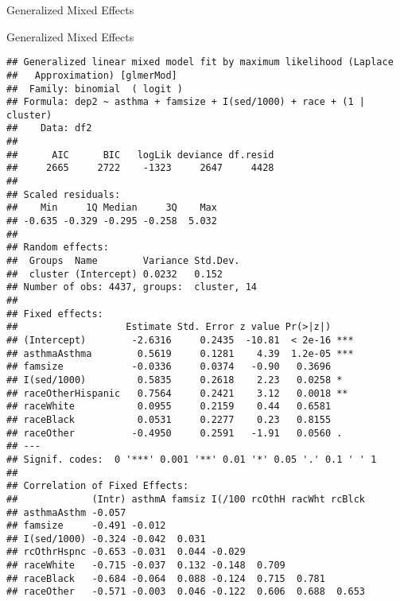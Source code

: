 \begin{frame}[fragile]{Generalized Mixed Effects}

\footnotesize

\begin{Shaded}
\begin{Highlighting}[]
\StringTok{ }\OperatorTok{~}\StringTok{ }\OperatorTok{+}\StringTok{ }\OperatorTok{+}\StringTok{ }\OperatorTok{/}\NormalTok{) }\OperatorTok{+}\StringTok{ }\OperatorTok{+}\StringTok{ }\NormalTok{(} \OperatorTok{|}\StringTok{ }
                  \NormalTok{)}
\end{Highlighting}
\end{Shaded}

\end{frame}

\begin{frame}[fragile]{Generalized Mixed Effects}

\tiny

\begin{verbatim}
## Generalized linear mixed model fit by maximum likelihood (Laplace
##   Approximation) [glmerMod]
##  Family: binomial  ( logit )
## Formula: dep2 ~ asthma + famsize + I(sed/1000) + race + (1 | cluster)
##    Data: df2
## 
##      AIC      BIC   logLik deviance df.resid 
##     2665     2722    -1323     2647     4428 
## 
## Scaled residuals: 
##    Min     1Q Median     3Q    Max 
## -0.635 -0.329 -0.295 -0.258  5.032 
## 
## Random effects:
##  Groups  Name        Variance Std.Dev.
##  cluster (Intercept) 0.0232   0.152   
## Number of obs: 4437, groups:  cluster, 14
## 
## Fixed effects:
##                   Estimate Std. Error z value Pr(>|z|)    
## (Intercept)        -2.6316     0.2435  -10.81  < 2e-16 ***
## asthmaAsthma        0.5619     0.1281    4.39  1.2e-05 ***
## famsize            -0.0336     0.0374   -0.90   0.3696    
## I(sed/1000)         0.5835     0.2618    2.23   0.0258 *  
## raceOtherHispanic   0.7564     0.2421    3.12   0.0018 ** 
## raceWhite           0.0955     0.2159    0.44   0.6581    
## raceBlack           0.0531     0.2277    0.23   0.8155    
## raceOther          -0.4950     0.2591   -1.91   0.0560 .  
## ---
## Signif. codes:  0 '***' 0.001 '**' 0.01 '*' 0.05 '.' 0.1 ' ' 1
## 
## Correlation of Fixed Effects:
##             (Intr) asthmA famsiz I(/100 rcOthH racWht rcBlck
## asthmaAsthm -0.057                                          
## famsize     -0.491 -0.012                                   
## I(sed/1000) -0.324 -0.042  0.031                            
## rcOthrHspnc -0.653 -0.031  0.044 -0.029                     
## raceWhite   -0.715 -0.037  0.132 -0.148  0.709              
## raceBlack   -0.684 -0.064  0.088 -0.124  0.715  0.781       
## raceOther   -0.571 -0.003  0.046 -0.122  0.606  0.688  0.653
\end{verbatim}

\end{frame}

